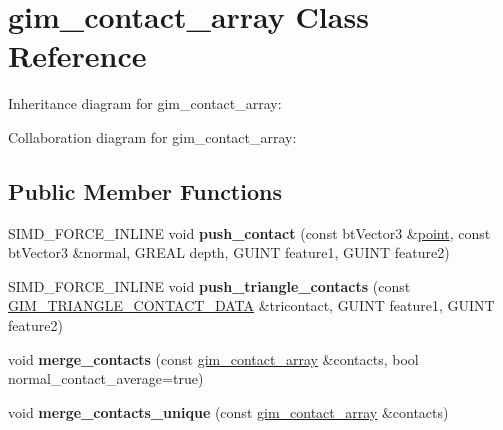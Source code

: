 \hypertarget{classgim__contact__array}{\section{gim\+\_\+contact\+\_\+array Class Reference}
\label{classgim__contact__array}
}


Inheritance diagram for gim\+\_\+contact\+\_\+array\+:


Collaboration diagram for gim\+\_\+contact\+\_\+array\+:
\subsection*{Public Member Functions}
\begin{DoxyCompactItemize}
\item 
\hypertarget{classgim__contact__array_aa35384cf722e52dad7e9966b8c5624f4}{S\+I\+M\+D\+\_\+\+F\+O\+R\+C\+E\+\_\+\+I\+N\+L\+I\+N\+E void {\bfseries push\+\_\+contact} (const bt\+Vector3 \&\hyperlink{structpoint}{point}, const bt\+Vector3 \&normal, G\+R\+E\+A\+L depth, G\+U\+I\+N\+T feature1, G\+U\+I\+N\+T feature2)}\label{classgim__contact__array_aa35384cf722e52dad7e9966b8c5624f4}

\item 
\hypertarget{classgim__contact__array_aaf165fe754942e9f157b39d7db181d60}{S\+I\+M\+D\+\_\+\+F\+O\+R\+C\+E\+\_\+\+I\+N\+L\+I\+N\+E void {\bfseries push\+\_\+triangle\+\_\+contacts} (const \hyperlink{struct_g_i_m___t_r_i_a_n_g_l_e___c_o_n_t_a_c_t___d_a_t_a}{G\+I\+M\+\_\+\+T\+R\+I\+A\+N\+G\+L\+E\+\_\+\+C\+O\+N\+T\+A\+C\+T\+\_\+\+D\+A\+T\+A} \&tricontact, G\+U\+I\+N\+T feature1, G\+U\+I\+N\+T feature2)}\label{classgim__contact__array_aaf165fe754942e9f157b39d7db181d60}

\item 
\hypertarget{classgim__contact__array_a74bc3c96a4552559f250df1528afae99}{void {\bfseries merge\+\_\+contacts} (const \hyperlink{classgim__contact__array}{gim\+\_\+contact\+\_\+array} \&contacts, bool normal\+\_\+contact\+\_\+average=true)}\label{classgim__contact__array_a74bc3c96a4552559f250df1528afae99}

\item 
\hypertarget{classgim__contact__array_ac72ddf0ededc37e0bbf8bdb0fa2f406c}{void {\bfseries merge\+\_\+contacts\+\_\+unique} (const \hyperlink{classgim__contact__array}{gim\+\_\+contact\+\_\+array} \&contacts)}\label{classgim__contact__array_ac72ddf0ededc37e0bbf8bdb0fa2f406c}

\end{DoxyCompactItemize}
